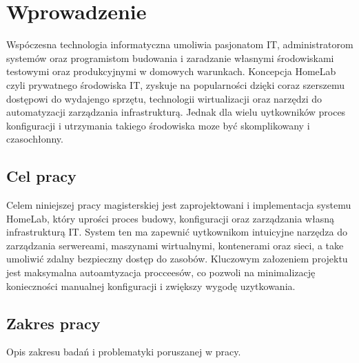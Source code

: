 \chapter{Wprowadzenie}
Wspóczesna technologia informatyczna umoliwia pasjonatom IT, administratorom systemów oraz programistom budowania i zaradzanie własnymi środowiskami testowymi oraz produkcyjnymi
w domowych warunkach. Koncepcja HomeLab czyli prywatnego środowiska IT, zyskuje na popularności dzięki coraz szerszemu dostępowi do wydajengo sprzętu, technologii wirtualizacji oraz narzędzi do automatyzacji zarządzania infrastrukturą.
Jednak dla wielu uytkowników proces konfiguracji i utrzymania takiego środowiska moze być skomplikowany i czasochłonny.


\section{Cel pracy}
Celem niniejszej pracy magisterskiej jest zaprojektowani i implementacja systemu HomeLab, który uprości proces budowy, konfiguracji oraz zarządzania własną infrastrukturą IT. System ten ma zapewnić uytkownikom intuicyjne narzędza do zarządzania serwereami, maszynami wirtualnymi, kontenerami oraz sieci, a take umoliwić zdalny bezpieczny dostęp do zasobów. Kluczowym załozeniem projektu jest maksymalna autoamtyzacja procceesów, co pozwoli na minimalizację konieczności manualnej konfiguracji i zwiększy wygodę uzytkowania.

\section{Zakres pracy}
Opis zakresu badań i problematyki poruszanej w pracy.